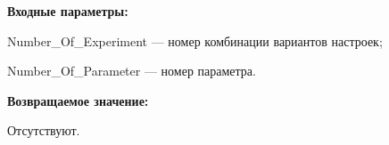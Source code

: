 \textbf{Входные параметры:}

Number\_Of\_Experiment --- номер комбинации вариантов настроек;
 
    Number\_Of\_Parameter --- номер параметра.

\textbf{Возвращаемое значение:}

Отсутствуют.